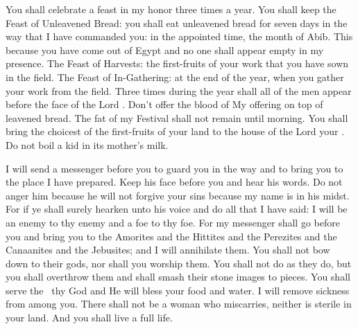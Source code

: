 \begin{inparaenum}
   You shall celebrate a feast in my honor three times a year.%
   You shall keep the Feast of Unleavened Bread: you shall eat unleavened bread for seven days in the way that I have commanded you: in the appointed time, the month of Abib. This because you have come out of Egypt and no one shall appear empty in my presence.%
   The Feast of Harvests: the first-fruits of your work that you have sown in the field. The Feast of In-Gathering: at the end of the year, when you gather your work from the field.%
   Three times during the year shall all of the men appear before the face of the Lord \god.%
   Don't offer the blood of My offering on top of leavened bread. The fat of my Festival shall not remain until morning.%
   You shall bring the choicest of the first-fruits of your land to the house of the Lord your \god. Do not boil a kid in its mother's milk.%
  
   I will send a messenger before you to guard you in the way and to bring you to the place I have prepared.%
   Keep his face before you and hear his words. Do not anger him because he will not forgive your sins because my name is in his midst.%
   For if ye shall surely hearken unto his voice and do all that I have said: I will be an enemy to thy enemy and a foe to thy foe.%
   For my messenger shall go before you and bring you to the Amorites and the Hittites and the Perezites and the Canaanites and the Jebusites; and I will annihilate them.%
   You shall not bow down to their gods, nor shall you worship them. You shall not do as they do, but you shall overthrow them and shall smash their stone images to pieces.%
   You shall serve the \lord\ thy God and He will bless your food and water. I will remove sickness from among you.%
   There shall not be a woman who miscarries, neither is sterile in your land. And you shall live a full life.%
  

\end{inparaenum}
